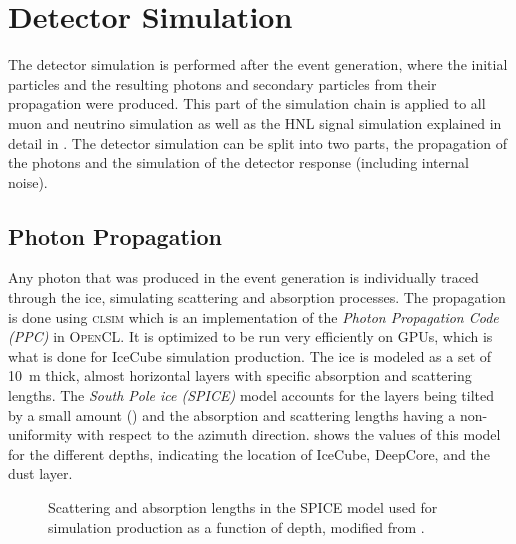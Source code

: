 \section{Detector Simulation}

The detector simulation is performed after the event generation, where the initial particles and the resulting photons and secondary particles from their propagation were produced. This part of the simulation chain is applied to all muon and neutrino simulation as well as the HNL signal simulation explained in detail in . The detector simulation can be split into two parts, the propagation of the photons and the simulation of the detector response (including internal noise).


\subsection{Photon Propagation} 

Any photon that was produced in the event generation is individually traced through the ice, simulating scattering and absorption processes.
The propagation is done using \textsc{clsim} \cite{clsim} which is an implementation of the \textit{Photon Propagation Code (\textsc{PPC})}  in \textsc{OpenCL}. It is optimized to be run very efficiently on GPUs, which is what is done for IceCube simulation production. The ice is modeled as a set of \SI{10}{\meter} thick, almost horizontal layers with specific absorption and scattering lengths. The \textit{South Pole ice (SPICE)} model  accounts for the layers being tilted by a small amount () and the absorption and scattering lengths having a non-uniformity with respect to the azimuth direction.  shows the values of this model for the different depths, indicating the location of IceCube, DeepCore, and the dust layer.

\begin{figure}
    
	\caption[Depth dependent scattering and absorption lengths]{Scattering and absorption lengths in the SPICE model used for simulation production as a function of depth, modified from \cite{ATrettin_phd}.}
\end{figure}

